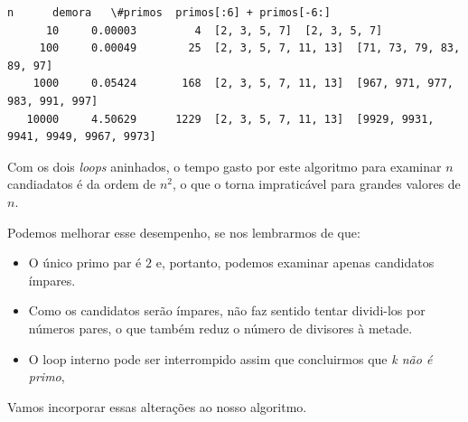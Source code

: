 \documentclass[11pt,a4paper]{article}
\providecommand{\tightlist}{%
      \setlength{\itemsep}{0pt}\setlength{\parskip}{0pt}}
\begin{document}
    \begin{Verbatim}[commandchars=\\\{\}]
       n      demora   \#primos  primos[:6] + primos[-6:]
      10     0.00003         4  [2, 3, 5, 7]  [2, 3, 5, 7]
     100     0.00049        25  [2, 3, 5, 7, 11, 13]  [71, 73, 79, 83, 89, 97]
    1000     0.05424       168  [2, 3, 5, 7, 11, 13]  [967, 971, 977, 983, 991, 997]
   10000     4.50629      1229  [2, 3, 5, 7, 11, 13]  [9929, 9931, 9941, 9949, 9967, 9973]

    \end{Verbatim}

    Com os dois \emph{loops} aninhados, o tempo gasto por este algoritmo
para examinar \(n\) candiadatos é da ordem de \(n^2\), o que o torna
impraticável para grandes valores de \(n\).

    Podemos melhorar esse desempenho, se nos lembrarmos de que:

\begin{itemize}
\tightlist
\item
  O único primo par é \(2\) e, portanto, podemos examinar apenas
  candidatos ímpares.
\item
  Como os candidatos serão ímpares, não faz sentido tentar dividi-los
  por números pares, o que também reduz o número de divisores à metade.
\item
  O loop interno pode ser interrompido assim que concluirmos que \emph{k
  não é primo},
\end{itemize}

    Vamos incorporar essas alterações ao nosso algoritmo.
\end{document}
